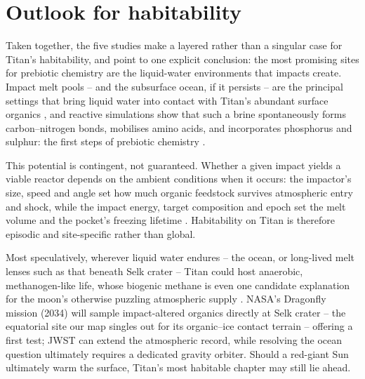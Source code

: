 \section{Outlook for habitability}

Taken together, the five studies make a layered rather than a singular case for Titan's habitability,
and point to one explicit conclusion: the most promising sites for prebiotic chemistry are the
liquid-water environments that impacts create. Impact melt pools -- and the subsurface ocean, if it
persists -- are the principal settings that bring liquid water into contact with Titan's abundant
surface organics \citep{Nicolaides2026, Crick2026}, and reactive simulations show that such a brine
spontaneously forms carbon--nitrogen bonds, mobilises amino acids, and incorporates phosphorus and
sulphur: the first steps of prebiotic chemistry \citep{Castlevetro2026}.

This potential is contingent, not guaranteed. Whether a given impact yields a viable reactor depends on
the ambient conditions when it occurs: the impactor's size, speed and angle set how much organic
feedstock survives atmospheric entry and shock, while the impact energy, target composition and epoch
set the melt volume and the pocket's freezing lifetime \citep{Nicolaides2026}. Habitability on Titan is
therefore episodic and site-specific rather than global.

Most speculatively, wherever liquid water endures -- the ocean, or long-lived melt lenses such as that
beneath Selk crater -- Titan could host anaerobic, methanogen-like life, whose biogenic methane is even
one candidate explanation for the moon's otherwise puzzling atmospheric supply \citep{IslamRahim2026}.
NASA's Dragonfly mission (2034) will sample impact-altered organics directly at Selk crater -- the
equatorial site our map singles out for its organic--ice contact terrain \citep{Lorenz2021Landing,
Meadows2026} -- offering a first test; JWST can extend the
atmospheric record, while resolving the ocean question ultimately requires a dedicated gravity orbiter.
Should a red-giant Sun ultimately warm the surface, Titan's most habitable chapter may still lie ahead.
